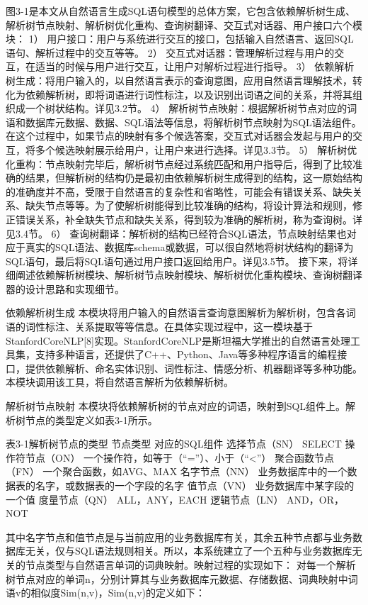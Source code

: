 图3-1是本文从自然语言生成SQL语句模型的总体方案，它包含依赖解析树生成、解析树节点映射、解析树优化重构、查询树翻译、交互式对话器、用户接口六个模块：
1）	用户接口：用户与系统进行交互的接口，包括输入自然语言、返回SQL语句、解析过程中的交互等等。
2）	交互式对话器：管理解析过程与用户的交互，在适当的时候与用户进行交互，让用户对解析过程进行指导。
3）	依赖解析树生成：将用户输入的，以自然语言表示的查询意图，应用自然语言理解技术，转化为依赖解析树，即将词语进行词性标注，以及识别出词语之间的关系，并将其组织成一个树状结构。详见3.2节。
4）	解析树节点映射：根据解析树节点对应的词语和数据库元数据、数据、SQL语法等信息，将解析树节点映射为SQL语法组件。在这个过程中，如果节点的映射有多个候选答案，交互式对话器会发起与用户的交互，将多个候选映射展示给用户，让用户来进行选择。详见3.3节。
5）	解析树优化重构：节点映射完毕后，解析树节点经过系统匹配和用户指导后，得到了比较准确的结果，但解析树的结构仍是最初由依赖解析树生成得到的结构，这一原始结构的准确度并不高，受限于自然语言的复杂性和省略性，可能会有错误关系、缺失关系、缺失节点等等。为了使解析树能得到比较准确的结构，将设计算法和规则，修正错误关系，补全缺失节点和缺失关系，得到较为准确的解析树，称为查询树。详见3.4节。
6）	查询树翻译：解析树的结构已经符合SQL语法，节点映射结果也对应于真实的SQL语法、数据库schema或数据，可以很自然地将树状结构的翻译为SQL语句，最后将SQL语句通过用户接口返回给用户。详见3.5节。
接下来，将详细阐述依赖解析树模块、解析树节点映射模块、解析树优化重构模块、查询树翻译器的设计思路和实现细节。

依赖解析树生成
本模块将用户输入的自然语言查询意图解析为解析树，包含各词语的词性标注、关系提取等等信息。在具体实现过程中，这一模块基于StanfordCoreNLP[8]实现。StanfordCoreNLP是斯坦福大学推出的自然语言处理工具集，支持多种语言，还提供了C++、Python、Java等多种程序语言的编程接口，提供依赖解析、命名实体识别、词性标注、情感分析、机器翻译等多种功能。本模块调用该工具，将自然语言解析为依赖解析树。

解析树节点映射
本模块将依赖解析树的节点对应的词语，映射到SQL组件上。解析树节点的类型定义如表3-1所示。

表3-1解析树节点的类型
节点类型	对应的SQL组件
选择节点（SN）	SELECT
操作符节点（ON）	一个操作符，如等于（“=”）、小于（“<”）
聚合函数节点（FN）	一个聚合函数，如AVG、MAX
名字节点（NN）	业务数据库中的一个数据表的名字，或数据表的一个字段的名字
值节点（VN）	业务数据库中某字段的一个值
度量节点（QN）	ALL，ANY，EACH
逻辑节点（LN）	AND，OR，NOT

其中名字节点和值节点是与当前应用的业务数据库有关，其余五种节点都与业务数据库无关，仅与SQL语法规则相关。所以，本系统建立了一个五种与业务数据库无关的节点类型与自然语言单词的词典映射。映射过程的实现如下：
对每一个解析树节点对应的单词n，分别计算其与业务数据库元数据、存储数据、词典映射中词语v的相似度Sim(n,v)，Sim(n,v)的定义如下：

